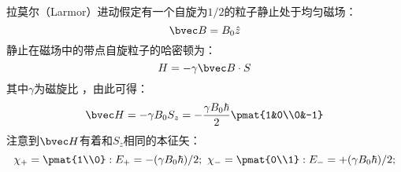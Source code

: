 
拉莫尔（Larmor）进动假定有一个自旋为$1/2$的粒子静止处于均匀磁场：
\begin{equation}
\bvec B =B_0\hat{z}
\end{equation}
静止在磁场中的带点自旋粒子的哈密顿为：
\begin{equation}
H = -\gamma\bvec B\cdot S
\end{equation}
其中$\gamma$为磁旋比 ，由此可得：
\begin{equation}
\bvec H = -\gamma B_0S_z=-\frac{\gamma B_0\hbar}{2}\pmat{1&0\\0&-1}
\end{equation}
注意到$\bvec H$有着和$S_z$相同的本征矢：
\begin{equation}
\chi_+ = \pmat{1\\0}:E_+=-(\gamma B_0\hbar)/2; \ \chi_- = \pmat{0\\1}:E_-=+(\gamma B_0\hbar)/2; 
\end{equation}
